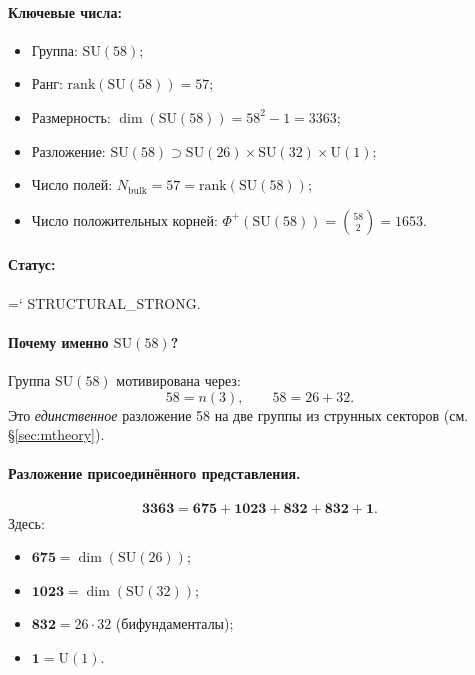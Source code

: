 \documentclass[11pt,a4paper]{article}
\newcommand{\SU}{\mathrm{SU}}
\newcommand{\Nbulk}{N_{\text{bulk}}}
\renewcommand{\texttt}[1]{{\ttfamily\hyphenchar\font=`\- #1}}
\theoremstyle{definition}
\begin{document}
\paragraph{Ключевые числа:}
\begin{itemize}
    \item Группа: $\SU(58)$;
    \item Ранг: $\mathrm{rank}(\SU(58)) = 57$;
    \item Размерность: $\dim(\SU(58)) = 58^2 - 1 = 3363$;
    \item Разложение: 
          $\SU(58) \supset \SU(26) \times \SU(32) \times \mathrm{U}(1)$;
    \item Число полей: $\Nbulk = 57 = \mathrm{rank}(\SU(58))$;
    \item Число положительных корней: 
          $\Phi^+(\SU(58)) = \binom{58}{2} = 1653$.
\end{itemize}

\paragraph{Статус:} \texttt{STRUCTURAL\_STRONG}.

\paragraph{Почему именно $\SU(58)$?}
Группа $\SU(58)$ мотивирована через:
\begin{equation}
    58 = n(3), \qquad 58 = 26 + 32.
\end{equation}
Это \emph{единственное} разложение 58 на две группы из 
струнных секторов (см. §\ref{sec:mtheory}).

\paragraph{Разложение присоединённого представления.}
\begin{equation}
    \mathbf{3363} = \mathbf{675} + \mathbf{1023} 
    + \mathbf{832} + \mathbf{832} + \mathbf{1}.
\end{equation}
Здесь:
\begin{itemize}
    \item $\mathbf{675} = \dim(\SU(26))$;
    \item $\mathbf{1023} = \dim(\SU(32))$;
    \item $\mathbf{832} = 26 \cdot 32$ (бифундаменталы);
    \item $\mathbf{1} = \mathrm{U}(1)$.
\end{itemize}
\end{document}
